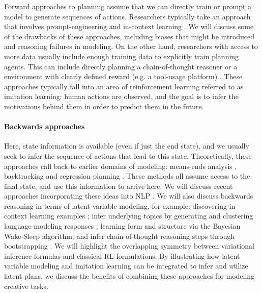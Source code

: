 \documentclass[11pt]{article}
\begin{document}
Forward approaches to planning assume that we can directly train or prompt a model to generate sequences of actions. Researchers typically take an approach that involves prompt-engineering and in-context learning \cite{tian2023macgyver}. We will discuss some of the drawbacks of these approaches, including biases that might be introduced and reasoning failures in modeling. On the other hand, researchers with access to more data usually include enough training data to explicitly train planning agents. This can include directly planning a chain-of-thought reasoner \cite{chen2024selfplayfinetuningconvertsweak} or a environment with clearly defined reward (e.g. a tool-usage platform) \cite{cote2018textworld, ALFRED20,ALFWorld20, huang2023affective,tian2023macgyver,song2024trialerrorexplorationbasedtrajectory}. These approaches typically fall into an area of reinforcement learning referred to as imitation learning: human actions are observed, and the goal is to infer the motivations behind them in order to predict them in the future. 

\paragraph{Backwards approaches}

Here, state information is available (even if just the end state), and we usually seek to infer the sequence of actions that lead to this state. Theoretically, these approaches call back to earlier domains of modeling:  means-ends analysis \cite{newell1961gps}, backtracking \cite{golomb1965backtrack} and regression planning \cite{mcdermott1991regression, xu2019regression}. These methods all assume access to the final state, and use this information to arrive here. We will discuss recent approaches incorporating these ideas into NLP \cite{gandhi2024stream, chen2024reverse}. We will also discuss backwards reasoning in terms of latent variable modeling, for example: discovering in-context learning examples \cite{min2022rethinking}; infer underlying topics by generating and clustering language-modeling responses \cite{pham2024topicgpt}; learning form and structure via the Bayesian Wake-Sleep algorithm; and infer chain-of-thought reasoning steps through bootstrapping \cite{zelikman2022star}. We will highlight the overlapping symmetry between variational inference formulas and classical RL formulations. By illustrating how latent variable modeling and imitation learning can be integrated to infer and utilize latent plans, we discuss the benefits of combining these approaches for modeling creative tasks.
\end{document}
